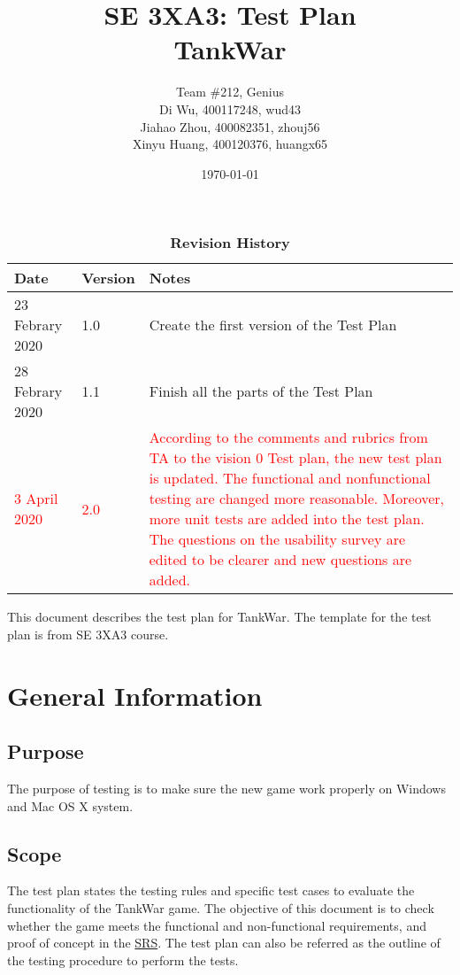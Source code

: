 \documentclass[12pt, titlepage]{article}
\title{SE 3XA3: Test Plan\\TankWar}
\author{Team \#212, Genius
		\\Di Wu, 400117248, wud43 
		\\Jiahao Zhou, 400082351, zhouj56 
		\\Xinyu Huang, 400120376, huangx65
}
\date{\today}
\begin{document}
\maketitle

\tableofcontents
\listoftables
\listoffigures

\begin{table}[bp]
\caption{\bf Revision History}
\begin{tabularx}{\textwidth}{p{3cm}p{2cm}X}
\toprule {\bf Date} & {\bf Version} & {\bf Notes}\\
\midrule
23 Febrary 2020 & 1.0 & Create the first version of the Test Plan\\
28 Febrary 2020 & 1.1 & Finish all the parts of the Test Plan\\
\textcolor{red}{3 April 2020} & \textcolor{red}{2.0} & \textcolor{red}{According to the comments and rubrics from TA to the vision 0 Test plan, the new test plan is updated. The functional and nonfunctional testing are changed more reasonable. Moreover, more unit tests are added into the test plan. The questions on the usability survey are edited to be clearer and new questions are added.}\\
\bottomrule
\end{tabularx}
\end{table}

\newpage


This document describes the test plan for TankWar. The template for the test plan is from SE 3XA3 course.

\section{General Information}

\subsection{Purpose}
The purpose of testing is to make sure the new game work properly on Windows and Mac OS X system.
\subsection{Scope}
The test plan states the testing rules and specific test cases to evaluate the functionality of the TankWar game. The objective of this document is to check whether the game meets the functional and non-functional requirements, and proof of concept in the \underline{SRS}. The test plan can also be referred as the outline of the testing procedure to perform the tests. 
\end{document}
